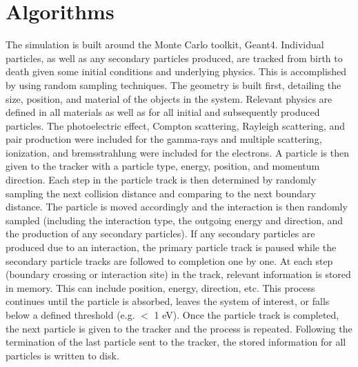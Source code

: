 \documentclass[10pt]{article}
\begin{document}
%






\section{Algorithms}

The simulation is built around the Monte Carlo toolkit, Geant4. Individual particles, as well as any secondary particles produced, are tracked from birth to death given some initial conditions and underlying physics. This is accomplished by using random sampling techniques. The geometry is built first, detailing the size, position, and material of the objects in the system. Relevant physics are defined in all materials as well as for all initial and subsequently produced particles. The photoelectric effect, Compton scattering, Rayleigh scattering, and pair production were included for the gamma-rays and multiple scattering, ionization, and bremsstrahlung were included for the electrons. A particle is then given to the tracker with a particle type, energy, position, and momentum direction. Each step in the particle track is then determined by randomly sampling the next collision distance and comparing to the next boundary distance. The particle is moved accordingly and the interaction is then randomly sampled (including the interaction type, the outgoing energy and direction, and the production of any secondary particles). If any secondary particles are produced due to an interaction, the primary particle track is paused while the secondary particle tracks are followed to completion one by one. At each step (boundary crossing or interaction site) in the track, relevant information is stored in memory. This can include position, energy, direction, etc. This process continues until the particle is absorbed, leaves the system of interest, or falls below a defined threshold (e.g. $<$ 1 eV). Once the particle track is completed, the next particle is given to the tracker and the process is repeated. Following the termination of the last particle sent to the tracker, the stored information for all particles is written to disk. 
\end{document}
